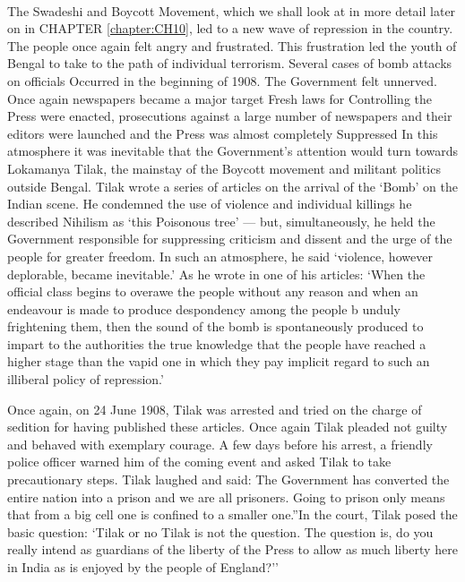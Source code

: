 \paragraph*{}
The Swadeshi and Boycott Movement, which we shall look at in more detail later on in CHAPTER \ref{chapter:CH10}, led to a new wave of repression in the country. The people once again felt angry and frustrated. This frustration led the youth of Bengal to take to the path of individual terrorism. Several cases of bomb attacks on officials Occurred in the beginning of 1908. The Government felt unnerved. Once again newspapers became a major target Fresh laws for Controlling the Press were enacted, prosecutions against a large number of newspapers and their editors were launched and the Press was almost completely Suppressed In this atmosphere it was inevitable that the Government's attention would turn towards Lokamanya Tilak, the mainstay of the Boycott movement and militant politics outside Bengal. Tilak wrote a series of articles on the arrival of the `Bomb' on the Indian scene. He condemned the use of violence and individual killings he described Nihilism as `this Poisonous tree' --- but, simultaneously, he held the Government responsible for suppressing criticism and dissent and the urge of the people for greater freedom. In such an atmosphere, he said `violence, however deplorable, became inevitable.' As he wrote in one of his articles: `When the official class begins to overawe the people without any reason and when an endeavour is made to produce despondency among the people b unduly frightening them, then the sound of the bomb is spontaneously produced to impart to the authorities the true knowledge that the people have reached a higher stage than the vapid one in which they pay implicit regard to such an illiberal policy of repression.'

Once again, on 24 June 1908, Tilak was arrested and tried on the charge of sedition for having published these articles. Once again Tilak pleaded not guilty and behaved with exemplary courage. A few days before his arrest, a friendly police officer warned him of the coming event and asked Tilak to take precautionary steps. Tilak laughed and said: The Government has converted the entire nation into a prison and we are all prisoners. Going to prison only means that from a big cell one is confined to a smaller one.''In the court, Tilak posed the basic question: `Tilak or no Tilak is not the question. The question is, do you really intend as guardians of the liberty of the Press to allow as much liberty here in India as is enjoyed by the people of England?''

